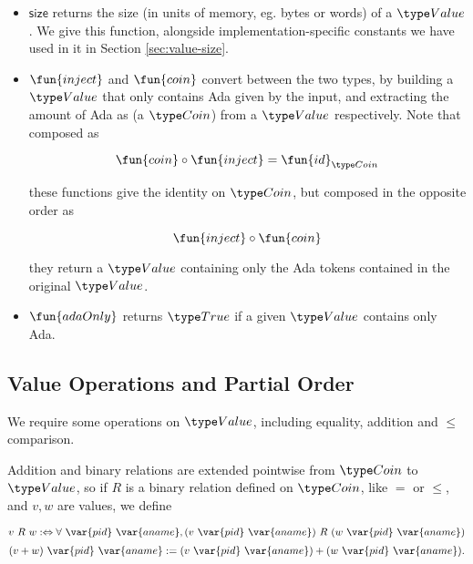 \begin{itemize}
  \item $\mathsf{size}$ returns the size (in units of memory, eg. bytes or words) of a $\Value$.
  We give this function, alongside implementation-specific constants we have used in it in Section \ref{sec:value-size}.

  \item $\fun{inject}$ and $\fun{coin}$ convert between the two types,
  by building a $\Value$ that only contains Ada given by the input, and extracting
  the amount of Ada as (a $\Coin$) from a $\Value$ respectively.
  Note that composed as

  \[\fun{coin} \circ \fun{inject} = \fun{id}_{\Coin}\]

  these functions give the identity on $\Coin$, but composed in the opposite order as

  \[\fun{inject} \circ \fun{coin}\]

  they return a $\Value$ containing only the Ada tokens contained in the original $\Value$.

  \item $\fun{adaOnly}$ returns $\True$ if a given $\Value$ contains only Ada.
\end{itemize}

\subsection*{Value Operations and Partial Order}
We require some operations on $\Value$, including equality, addition and $\leq$ comparison.

Addition and binary relations are extended pointwise from $\Coin$ to $\Value$, so if $R$ is a binary relation defined on $\Coin$, like $=$ or $\leq$, and $v, w$ are values, we define

\[ v~R~w :\Leftrightarrow \forall~\var{pid}~\var{aname}, (v~\var{pid}~\var{aname})~R~(w~\var{pid}~\var{aname}) \]
\[ (v + w)~\var{pid}~\var{aname} := (v~\var{pid}~\var{aname}) + (w~\var{pid}~\var{aname}). \]
